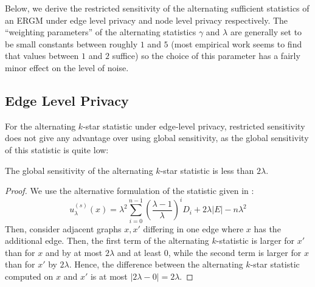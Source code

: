 Below, we derive the restricted sensitivity of the alternating sufficient statistics of an ERGM under edge level privacy and node level privacy respectively. The ``weighting parameters'' of the alternating statistics $\gamma$ and $\lambda$ are generally set to be small constants between roughly $1$ and $5$ (most empirical work seems to find that values between $1$ and $2$ suffice) so the choice of this parameter has a fairly minor effect on the level of noise.

\subsection{Edge Level Privacy} 

For the alternating $k$-star statistic under edge-level privacy, restricted sensitivity does not
give any advantage over using global sensitivity, as the global sensitivity of this statistic is quite low:

\begin{claim}
The global sensitivity of the alternating $k$-star statistic is less than $2\lambda$. 
\end{claim}
\begin{proof}
We use the alternative formulation of the statistic given in :
$$u_\lambda^{(s)}(x) =  \lambda^2 \sum_{i = 0}^{n-1} \left(\frac{\lambda - 1}{\lambda}\right)^i D_i + 2 \lambda |E| - n \lambda^2$$
Then, consider adjacent graphs $x, x'$ differing in one edge where $x$ has the additional edge. Then, the first term of the alternating $k$-statistic is larger for $x'$ than for $x$ and by at most $2\lambda$ and at least $0$, while the second term is larger for $x$ than for $x'$ by $2\lambda$. Hence, the difference between the alternating $k$-star statistic computed on $x$ and $x'$ is at most $|2\lambda - 0| = 2\lambda$.
\end{proof}

